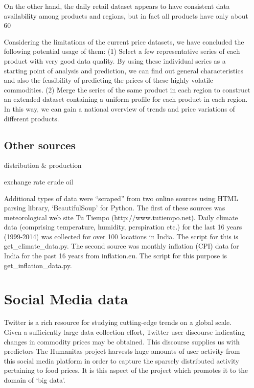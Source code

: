 On the other hand, the daily retail dataset appears to have consistent data availability among products and regions, but in fact all products have only about 60%

Considering the limitations of the current price datasets, we have concluded the following potential usage of them: (1) Select a few representative series of each product with very good data quality. By using these individual series as a starting point of analysis and prediction, we can find out general characteristics and also the feasibility of predicting the prices of these highly volatile commodities. (2) Merge the series of the same product in each region to construct an extended dataset containing a uniform profile for each product in each region. In this way, we can gain a national overview of trends and price variations of different products.

\subsection*{Other sources}
distribution \& production

exchange rate
crude oil

Additional types of data were ``scraped'' from two online sources using HTML parsing library, `BeautifulSoup' for Python. The first of these sources was meteorological web site Tu Tiempo (http://www.tutiempo.net). Daily climate data (comprising temperature, humidity, perspiration etc.) for the last 16 years (1999-2014) was collected for over 100 locations in India. The script for this is get\_climate\_data.py. The second source was monthly inflation (CPI) data for India for the past 16 years from inflation.eu. The script for this purpose is get\_inflation\_data.py.

\section*{Social Media data}
Twitter is a rich resource for studying cutting-edge trends on a global scale. Given a sufficiently large data collection effort, Twitter user discourse indicating changes in commodity prices may be obtained. This discourse supplies us with predictors The Humanitas project harvests huge amounts of user activity from this social media platform in order to capture the sparsely distributed activity pertaining to food prices. It is this aspect of the project which promotes it to the domain of `big data'.

